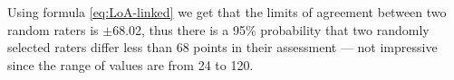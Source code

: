 \documentclass[aoas]{imsart}
\makeatletter
\newcommand{\code}[1]{\texttt{#1}\@\xspace}
\makeatother
\begin{document}


Using formula \eqref{eq:LoA-linked} we get that the limits of agreement between two
random raters is $\pm$68.02, thus
there is a 95\% probability that two randomly selected raters differ
less than 68 points in their
assessment --- not impressive since the range of values are from 24 to
120.




\end{document}
